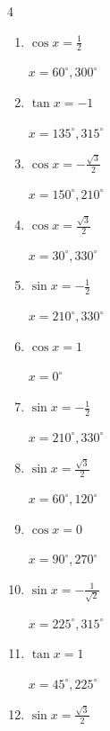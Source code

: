 \begin{multicols}{4}
\begin{enumerate}
        $\displaystyle x = 120^{\circ} , 240^{\circ}$

  \item $\displaystyle \cos{x}  = \frac{1}{2}$

        $\displaystyle x = 60^{\circ} , 300^{\circ}$

  \item $\displaystyle \tan{x}  = -1$

        $\displaystyle x = 135^{\circ} , 315^{\circ}$

  \item $\displaystyle \cos{x}  = -\frac{\sqrt{3}}{2}$

        $\displaystyle x = 150^{\circ} , 210^{\circ}$

  \item $\displaystyle \cos{x}  = \frac{\sqrt{3}}{2}$

        $\displaystyle x = 30^{\circ} , 330^{\circ}$

  \item $\displaystyle \sin{x}  = -\frac{1}{2}$

        $\displaystyle x = 210^{\circ} , 330^{\circ}$

  \item $\displaystyle \cos{x}  = 1$

        $\displaystyle x = 0^{\circ}$

  \item $\displaystyle \sin{x}  = -\frac{1}{2}$

        $\displaystyle x = 210^{\circ} , 330^{\circ}$

  \item $\displaystyle \sin{x}  = \frac{\sqrt{3}}{2}$

        $\displaystyle x = 60^{\circ} , 120^{\circ}$

  \item $\displaystyle \cos{x}  = 0$

        $\displaystyle x = 90^{\circ} , 270^{\circ}$

  \item $\displaystyle \sin{x}  = -\frac{1}{\sqrt{2}}$

        $\displaystyle x = 225^{\circ} , 315^{\circ}$

  \item $\displaystyle \tan{x}  = 1$

        $\displaystyle x = 45^{\circ} , 225^{\circ}$

  \item $\displaystyle \sin{x}  = \frac{\sqrt{3}}{2}$


\end{enumerate}
\end{multicols}

